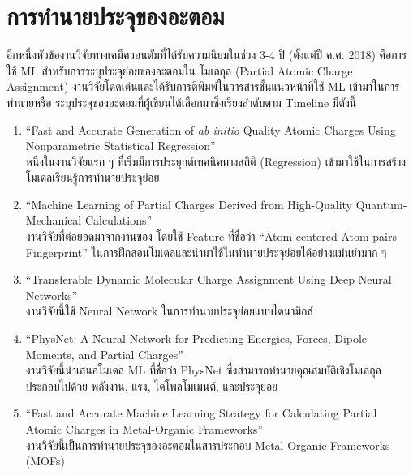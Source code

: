 \section{การทำนายประจุของอะตอม}
\label{sec:pred_atomic_charge}

อีกหนึ่งหัวข้องานวิจัยทางเคมีควอนตัมที่ได้รับความนิยมในช่วง 3-4 ปี (ตั้งแต่ปี ค.ศ. 2018) คือการใช้ ML สำหรับการระบุประจุย่อยของอะตอมใน%
โมเลกุล (Partial Atomic Charge Assignment) งานวิจัยโดดเด่นและได้รับการตีพิมพ์ในวารสารชั้นแนวหน้าที่ใช้ ML เข้ามาในการทำนายหรือ%
ระบุประจุของอะตอมที่ผู้เขียนได้เลือกมาซึ่งเรียงลำดับตาม Timeline มีดังนี้

\begin{enumerate}
    \item \enquote{Fast and Accurate Generation of \textit{ab initio} Quality Atomic Charges Using Nonparametric 
    Statistical Regression}\autocite{rai2013} \\ 
    หนึ่งในงานวิจัยแรก ๆ ที่เริ่มมีการประยุกต์เทคนิคทางสถิติ (Regression) เข้ามาใช้ในการสร้างโมเดลเรียนรู้การทำนายประจุย่อย
    
    \item \enquote{Machine Learning of Partial Charges Derived from High-Quality Quantum-Mechanical Calculations} 
    \autocite{bleiziffer2018} \\
    งานวิจัยที่ต่อยอดมาจากงานของ โดยใช้ Feature ที่ชื่อว่า \enquote{Atom-centered Atom-pairs Fingerprint}\autocite{carhart1985} 
    ในการฝึกสอนโมเดลและนำมาใช้ในทำนายประจุย่อยได้อย่างแม่นยำมาก ๆ
    
    \item \enquote{Transferable Dynamic Molecular Charge Assignment Using Deep Neural Networks}\autocite{nebgen2018} \\
    งานวิจัยนี้ใช้ Neural Network ในการทำนายประจุย่อยแบบไดนามิกส์
    
    \item \enquote{PhysNet: A Neural Network for Predicting Energies, Forces, Dipole Moments, and Partial Charges}
    \autocite{unke2019} \\
    งานวิจัยนี้นำเสนอโมเดล ML ที่ชื่อว่า PhysNet ซึ่งสามารถทำนายคุณสมบัติเชิงโมเลกุล ประกอบไปด้วย พลังงาน, แรง, ไดโพลโมเมนต์, 
    และประจุย่อย
    
    \item \enquote{Fast and Accurate Machine Learning Strategy for Calculating Partial Atomic Charges in 
    Metal-Organic Frameworks}\autocite{kancharlapalli2021} \\ 
    งานวิจัยนี้เป็นการทำนายประจุของอะตอมในสารประกอบ Metal-Organic Frameworks (MOFs)
    

\end{enumerate}
